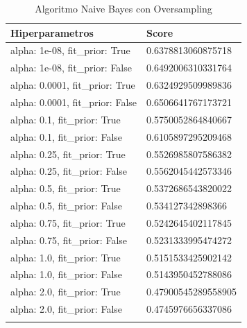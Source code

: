 \documentclass{report}
\begin{document}
{\begin{longtable}{|p{155.6px}|p{100.3px}|}
                    \hline
                    \textbf{Hiperparametros} & \textbf{Score}\\
                    \hline                    
                    alpha: 1e-08, fit\_prior: True&0.6378813060875718\\ 
                    \hline
                    alpha: 1e-08, fit\_prior: False&0.6492006310331764\\ 
                    \hline
                    alpha: 0.0001, fit\_prior: True&0.6324929509989836\\ 
                    \hline                    
                    alpha: 0.0001, fit\_prior: False&0.6506641767173721\\ 
                    \hline
                    alpha: 0.1, fit\_prior: True&0.5750052864840667\\ 
                    \hline                    
                    alpha: 0.1, fit\_prior: False&0.6105897295209468\\ 
                    \hline
                    alpha: 0.25, fit\_prior: True&0.5526985807586382\\ 
                    \hline                    
                    alpha: 0.25, fit\_prior: False&0.5562045442573346\\ 
                    \hline
                    alpha: 0.5, fit\_prior: True&0.5372686543820022\\ 
                    \hline                    
                    alpha: 0.5, fit\_prior: False&0.534127342898366\\ 
                    \hline
                    alpha: 0.75, fit\_prior: True&0.5242645402117845\\ 
                    \hline                    
                    alpha: 0.75, fit\_prior: False&0.5231333995474272\\ 
                    \hline
                    alpha: 1.0, fit\_prior: True&0.5151533425902142\\ 
                    \hline                    
                    alpha: 1.0, fit\_prior: False&0.5143950452788086\\ 
                    \hline
                    alpha: 2.0, fit\_prior: True&0.47900545289558905\\ 
                    \hline                    
                    alpha: 2.0, fit\_prior: False&0.4745976656337086\\ 
                    \hline
                    \caption{Algoritmo Naive Bayes con Oversampling}

\end{longtable}}
\end{document}
